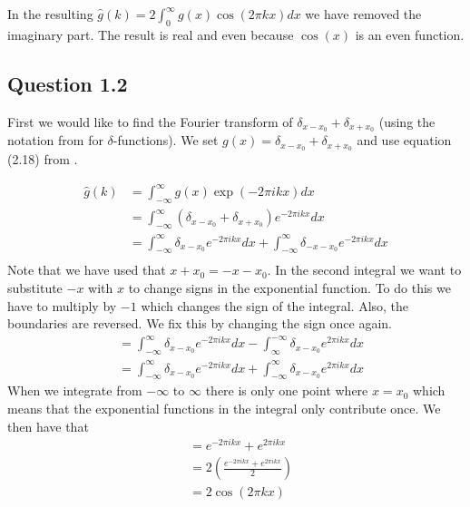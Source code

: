 \documentclass[a4paper, 10pt, final]{article}
\begin{document}
In the resulting $\hat{g}(k) = 2 \int_{0}^{\infty}{g(x)\cos(2\pi kx)dx}$
we have removed the imaginary part. The result is real and even because
$\cos(x)$ is an even function.

\subsection*{Question 1.2}
First we would like to find the Fourier transform of $\delta_{x - x_0} +
\delta_{x + x_0}$ (using the notation from \citeauthor{jahne-digital} for
$\delta$-functions). We set $g(x) = \delta_{x - x_0} + \delta_{x + x_0}$
and use equation (2.18) from \citeauthor{jahne-digital}.

\begin{align*}
    \hat{g}(k) & = \int_{-\infty}^{\infty}{g(x)\exp(-2\pi ikx)dx}\\
    & = \int_{-\infty}^{\infty}{(\delta_{x - x_0} + \delta_{x + x_0})e^{-2\pi ikx}dx}\\
    & = \int_{-\infty}^{\infty}{\delta_{x - x_0}e^{-2\pi ikx}dx +
    \int_{-\infty}^{\infty}{\delta_{-x - x_0}e^{-2\pi ikx}dx}}\\
\end{align*}
Note that we have used that $x + x_0 = -x - x_0$. In the second integral
we want to substitute $-x$ with $x$ to change signs in the exponential
function. To do this we have to multiply by $-1$ which changes the sign
of the integral. Also, the boundaries are reversed. We fix this by
changing the sign once again.
\begin{align*}
    & = \int_{-\infty}^{\infty}{\delta_{x - x_0}e^{-2\pi ikx}dx - \int_{\infty}^{-\infty}{\delta_{x - x_0}e^{2\pi ikx}dx}}\\
    & = \int_{-\infty}^{\infty}{\delta_{x - x_0}e^{-2\pi ikx}dx + \int_{-\infty}^{\infty}{\delta_{x - x_0}e^{2\pi ikx}dx}}
\end{align*}
When we integrate from $-\infty$ to $\infty$ there is only one point
where $x = x_0$ which means that the exponential functions in the
integral only contribute once. We then have that
\begin{align*}
    & = e^{-2\pi ikx} + e^{2\pi ikx}\\
    & = 2 \left(\frac{e^{-2\pi ikx} + e^{2\pi ikx}}{2}\right)\\
    & = 2 \cos(2\pi kx)
\end{align*}
\end{document}
